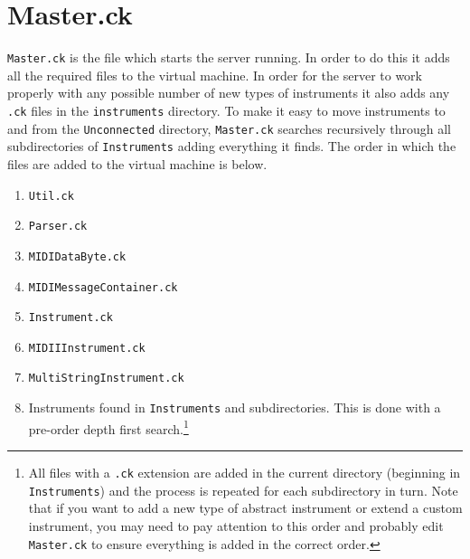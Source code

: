 \documentclass[../main.tex]{subfiles}
\begin{document}
\section{Master.ck}
\texttt{Master.ck} is the file which starts the server running. In order to do this it adds all the required files to the virtual machine. In order for the server to work 
properly with any possible number of new types of instruments it also adds any \texttt{.ck} files in the \texttt{instruments} directory. To make it easy to move
 instruments to and from the \texttt{Unconnected} directory, \texttt{Master.ck} searches recursively through all subdirectories of \texttt{Instruments} adding 
everything it finds. The order in which the files are added to the virtual machine is below.

\begin{enumerate} [\bf 1.]
	\item\texttt{Util.ck}
	\item\texttt{Parser.ck}
	\item\texttt{MIDIDataByte.ck}
	\item\texttt{MIDIMessageContainer.ck}
	\item\texttt{Instrument.ck}
	\item\texttt{MIDIIInstrument.ck}
	\item\texttt{MultiStringInstrument.ck}
	\item Instruments found in \texttt{Instruments} and subdirectories. This is done with a pre-order depth first search.\footnote{All files with a \texttt{.ck} 
	extension are added in the current directory (beginning in \texttt{Instruments}) and the process is repeated for each subdirectory in turn. Note that if you
	want to add a new type of abstract instrument or extend a custom instrument, you may need to pay attention to this order and probably edit 
	\texttt{Master.ck} to ensure everything is added in the correct order.}
\end{enumerate}
\end{document}
